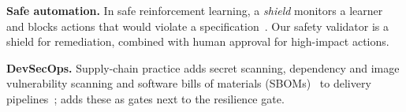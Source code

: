 \textbf{Safe automation.} In safe reinforcement learning, a \emph{shield} monitors a learner and
blocks actions that would violate a specification~\cite{alshiekh2018shielding}. Our safety validator
is a shield for remediation, combined with human approval for high-impact actions.

\textbf{DevSecOps.} Supply-chain practice adds secret scanning, dependency and image vulnerability
scanning and software bills of materials (SBOMs)~\cite{ntia2021sbom} to delivery
pipelines~\cite{humble2010continuous}; \sys{} adds these as gates next to the resilience gate.
